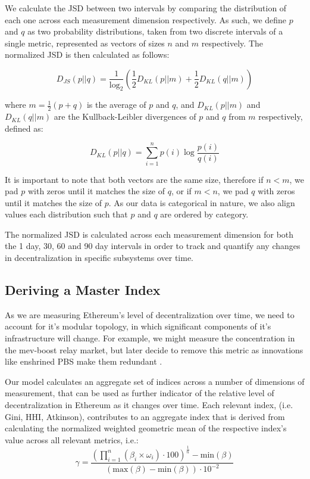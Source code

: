 \documentclass[conference]{IEEEtran}
\begin{document}
We calculate the JSD between two intervals by comparing the distribution of each one across each measurement dimension respectively.  As such, we define $p$ and $q$  as two probability distributions, taken from two discrete intervals of a single metric, represented as vectors of sizes $n$ and $m$ respectively. The normalized JSD is then calculated as follows:


\[ D_{JS}(p||q) = \frac{1}{\log_2} \left( \frac{1}{2} D_{KL}(p||m) + \frac{1}{2} D_{KL}(q||m) \right) \]

\vspace{8pt}

where $m = \frac{1}{2} (p + q)$  is the average of $p$ and $q$, and $D_{KL}(p||m)$ and $D_{KL}(q||m)$ are the Kullback-Leibler divergences of $p$ and $q$  from $m$ respectively, defined as:

\vspace{6pt}

\[
D_{KL}(p||q) = \sum_{i=1}^{n} p(i) \log \frac{p(i)}{q(i)}
\]

\vspace{8pt}

It is important to note that both vectors are the same size, therefore if $n < m$,  we pad $p$ with zeros until it matches the size of $q$, or if $m < n$, we pad $q$ with zeros until it matches the size of $p$.  As our data is categorical in nature, we also align values each distribution such that $p$ and $q$ are ordered by category.  

The normalized JSD is calculated across each measurement dimension for both the 1 day, 30, 60 and 90 day intervals in order to track and quantify any changes in decentralization in specific subsystems over time.

\subsection{Deriving a Master Index}

As we are measuring Ethereum's level of decentralization over time, we need to account for it's modular topology, in which significant components of it's infrastructure will change.  For example, we might measure the concentration in the mev-boost relay market, but later decide to remove this metric as innovations like enshrined PBS make them redundant \cite{neuder2023}.

Our model calculates an aggregate set of indices across a number of dimensions of measurement, that can be used as further indicator of the relative level of decentralization in Ethereum as it changes over time.  Each relevant index, (i.e. Gini, HHI, Atkinson), contributes to an aggregate index that is derived from calculating the normalized weighted geometric mean of the respective index's value across all relevant metrics, i.e.:
\[ \gamma = \frac{{\left(\prod_{i=1}^{n} (\beta_i \times \omega_i)\cdot100\right)^{\frac{1}{n}} - \text{min}\left(\beta\right)}}{{(\text{max}\left(\beta\right) - \text{min}\left(\beta\right))\cdot10^{-2}}} \]
\end{document}
